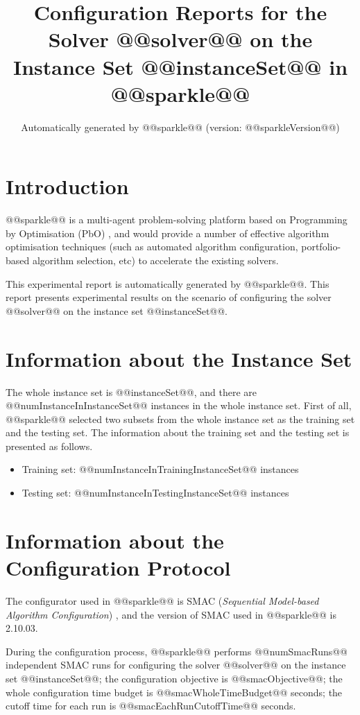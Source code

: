 \documentclass[british]{article}
\title{Configuration Reports for the Solver @@solver@@ on the Instance Set @@instanceSet@@ in @@sparkle@@ }
\author{ Automatically generated by @@sparkle@@ (version: @@sparkleVersion@@) }
\begin{document}
\maketitle %


\section{Introduction}
\label{sec:Introduction}

@@sparkle@@ \cite{Hoos15} is a multi-agent problem-solving platform based on Programming by Optimisation (PbO) \cite{Hoos12}, and would provide a number of effective algorithm optimisation techniques (such as automated algorithm configuration, portfolio-based algorithm selection, etc) to accelerate the existing solvers.

This experimental report is automatically generated by @@sparkle@@. This report presents experimental results on the scenario of configuring the solver @@solver@@ on the instance set @@instanceSet@@.

\section{Information about the Instance Set}

The whole instance set is @@instanceSet@@, and there are @@numInstanceInInstanceSet@@ instances in the whole instance set. First of all, @@sparkle@@ selected two subsets from the whole instance set as the training set and the testing set. The information about the training set and the testing set is presented as follows.

\begin{itemize}
\item Training set: @@numInstanceInTrainingInstanceSet@@ instances
\item Testing set: @@numInstanceInTestingInstanceSet@@ instances
\end{itemize}

\section{Information about the Configuration Protocol}

The configurator used in @@sparkle@@ is SMAC ({\em Sequential Model-based Algorithm Configuration}) \cite{HutEtAl11}, and the version of SMAC used in @@sparkle@@ is 2.10.03.

During the configuration process, @@sparkle@@ performs @@numSmacRuns@@ independent SMAC runs for configuring the solver @@solver@@ on the instance set @@instanceSet@@; the configuration objective is @@smacObjective@@; the whole configuration time budget is @@smacWholeTimeBudget@@ seconds; the cutoff time for each run is @@smacEachRunCutoffTime@@ seconds.
\end{document}
